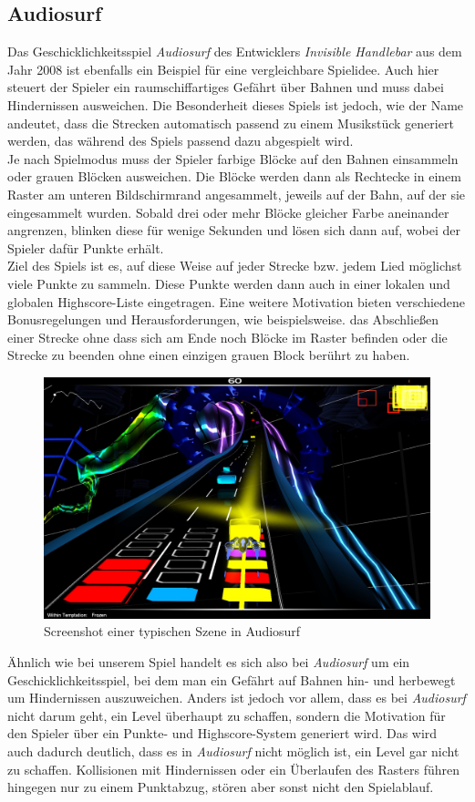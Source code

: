 \subsection{Audiosurf}

Das Geschicklichkeitsspiel \textit{Audiosurf} des Entwicklers \textit{Invisible Handlebar} aus dem Jahr 2008 ist ebenfalls ein Beispiel für eine vergleichbare Spielidee. Auch hier steuert der Spieler ein raumschiffartiges Gefährt über Bahnen und muss dabei Hindernissen ausweichen. Die Besonderheit dieses Spiels ist jedoch, wie der Name andeutet, dass die Strecken automatisch passend zu einem Musikstück generiert werden, das während des Spiels passend dazu abgespielt wird.\\
Je nach Spielmodus muss der Spieler farbige Blöcke auf den Bahnen einsammeln oder grauen Blöcken ausweichen. Die Blöcke werden dann als Rechtecke in einem Raster am unteren Bildschirmrand angesammelt, jeweils auf der Bahn, auf der sie eingesammelt wurden. Sobald drei oder mehr Blöcke gleicher Farbe aneinander angrenzen, blinken diese für wenige Sekunden und lösen sich dann auf, wobei der Spieler dafür Punkte erhält.\\
Ziel des Spiels ist es, auf diese Weise auf jeder Strecke bzw. jedem Lied möglichst viele Punkte zu sammeln. Diese Punkte werden dann auch in einer lokalen und globalen Highscore-Liste eingetragen. Eine weitere Motivation bieten verschiedene Bonusregelungen und Herausforderungen, wie beispielsweise. das Abschließen einer Strecke ohne dass sich am Ende noch Blöcke im Raster befinden oder die Strecke zu beenden ohne einen einzigen grauen Block berührt zu haben.\\
\begin{figure}[ht]
\centering
\includegraphics[width=.7\textwidth]{gfx/recherche/audiosurf.jpg}
\caption{Screenshot einer typischen Szene in Audiosurf\footnotemark}
\end{figure}
Ähnlich wie bei unserem Spiel handelt es sich also bei \textit{Audiosurf} um ein Geschicklichkeitsspiel, bei dem man ein Gefährt auf Bahnen hin- und herbewegt um Hindernissen auszuweichen. Anders ist jedoch vor allem, dass es bei \textit{Audiosurf} nicht darum geht, ein Level überhaupt zu schaffen, sondern die Motivation für den Spieler über ein Punkte- und Highscore-System generiert wird. Das wird auch dadurch deutlich, dass es in \textit{Audiosurf} nicht möglich ist, ein Level gar nicht zu schaffen. Kollisionen mit Hindernissen oder ein Überlaufen des Rasters führen hingegen nur zu einem Punktabzug, stören aber sonst nicht den Spielablauf.
